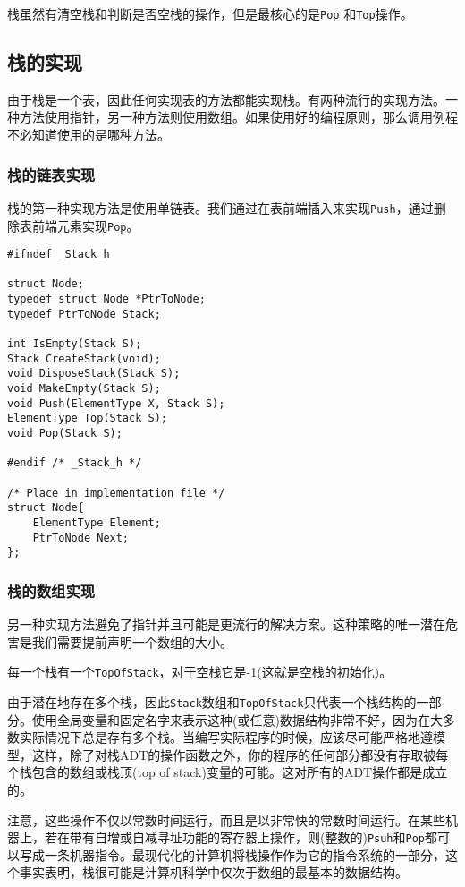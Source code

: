 \documentclass[utf8]{ctexbook}
\begin{document}
栈虽然有清空栈和判断是否空栈的操作，但是最核心的是\verb|Pop| 和\verb|Top|操作。
\subsection{栈的实现}
由于栈是一个表，因此任何实现表的方法都能实现栈。有两种流行的实现方法。一种方法使用指针，另一种方法则使用数组。如果使用好的编程原则，那么调用例程不必知道使用的是哪种方法。
\subsubsection{栈的链表实现}
栈的第一种实现方法是使用单链表。我们通过在表前端插入来实现\verb|Push|，通过删除表前端元素实现\verb|Pop|。
\begin{lstlisting}
#ifndef _Stack_h 

struct Node;
typedef struct Node *PtrToNode;
typedef PtrToNode Stack;

int IsEmpty(Stack S);
Stack CreateStack(void);
void DisposeStack(Stack S);
void MakeEmpty(Stack S);
void Push(ElementType X, Stack S);
ElementType Top(Stack S);
void Pop(Stack S);

#endif /* _Stack_h */

/* Place in implementation file */ 
struct Node{
    ElementType Element;
    PtrToNode Next;
};
\end{lstlisting}

\subsubsection{栈的数组实现}
另一种实现方法避免了指针并且可能是更流行的解决方案。这种策略的唯一潜在危害是我们需要提前声明一个数组的大小。

每一个栈有一个\verb|TopOfStack|，对于空栈它是-1(这就是空栈的初始化)。

由于潜在地存在多个栈，因此\verb|Stack|数组和\verb|TopOfStack|只代表一个栈结构的一部分。{\heiti 使用全局变量和固定名字来表示这种(或任意)数据结构非常不好}，因为在大多数实际情况下总是存有多个栈。当编写实际程序的时候，应该尽可能严格地遵模型，这样，除了对栈ADT的操作函数之外，{\heiti 你的程序的任何部分都没有存取被每个栈包含的数组或栈顶(top of stack)变量的可能}。这对所有的ADT操作都是成立的。

注意，这些操作不仅以常数时间运行，而且是以非常快的常数时间运行。在某些机器上，若在带有自增或自减寻址功能的寄存器上操作，则(整数的)\verb|Psuh|和\verb|Pop|都可以写成一条机器指令。最现代化的计算机将栈操作作为它的指令系统的一部分，这个事实表明，栈很可能是计算机科学中仅次于数组的最基本的数据结构。
\end{document}
